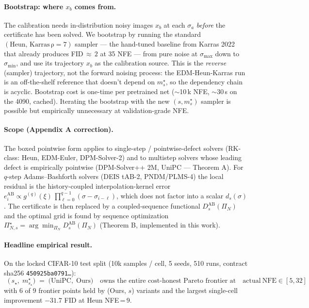 \documentclass[11pt]{article}
\begin{document}
\paragraph{Bootstrap: where \(x_b\) comes from.} The calibration needs
in-distribution noisy images \(x_b\) at each \(\sigma_a\) \emph{before}
the certificate has been solved. We bootstrap by running the standard
\((\mathrm{Heun},\,\mathrm{Karras\,\rho{=}7})\) sampler --- the
hand-tuned baseline from Karras 2022 that already produces
FID\,\(\approx\,2\) at 35 NFE --- from pure noise at \(\sigma_{\max}\)
down to \(\sigma_{\min}\), and use its trajectory \(x_b\) as the
calibration source. This is the \emph{reverse} (sampler) trajectory,
not the forward noising process: the EDM-Heun-Karras run is an
off-the-shelf reference that doesn't depend on \(m_s^\star\), so the
dependency chain is acyclic. Bootstrap cost is one-time per
pretrained net (\(\sim\)10\,k NFE, \(\sim\)30\,s on the 4090, cached).
Iterating the bootstrap with the new \((s, m_s^\star)\) sampler is
possible but empirically unnecessary at validation-grade NFE.

\paragraph{Scope (Appendix A correction).} The boxed pointwise form
applies to single-step / pointwise-defect solvers (RK-class: Heun, EDM-Euler, DPM-Solver-2) and to multistep solvers whose leading
defect is empirically pointwise (DPM-Solver++ 2M, UniPC --- Theorem A).
For \(q\)-step Adams--Bashforth solvers (DEIS tAB-2, PNDM/PLMS-4) the
local residual is the history-coupled interpolation-kernel error
\(e_i^{\mathrm{AB}} \propto g^{(q)}(\xi)\,\prod_{\ell=0}^{q-1}(\sigma-\sigma_{i-\ell})\),
which does not factor into a scalar \(d_s(\sigma)\). The certificate is
then replaced by a coupled-sequence functional
\(D_s^{\mathrm{AB}}(\Pi_N)\) and the optimal grid is found by
sequence optimization \(\Pi_{N,s}^\star = \arg\min_{\Pi_N} D_s^{\mathrm{AB}}(\Pi_N)\) (Theorem B,
implemented in this work).

\paragraph{Headline empirical result.} On the locked CIFAR-10 test split (10k samples / cell, 5 seeds, 510 runs, contract sha256 \texttt{450925ba0791\ldots}):
\[
\boxed{\;\;
\bigl(\,s_\star,\;m^\star_{s_\star}\bigr) \;=\; \bigl(\mathrm{UniPC},\;\mathrm{Ours}\bigr)
\quad\text{owns the entire cost-honest Pareto frontier at}\quad
\mathrm{actual\ NFE}\in[5,32]
\;\;}
\]
with 6 of 9 frontier points held by (Ours, \(s\)) variants and the largest
single-cell improvement \(-31.7\) FID at Heun NFE\,=\,9.
\end{document}
